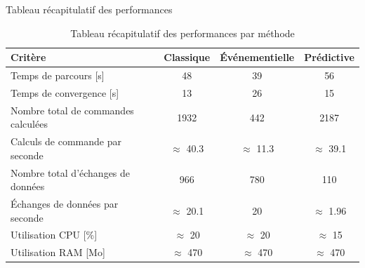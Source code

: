 \begin{frame}{Tableau récapitulatif des performances}
    
    \begin{table} %
    \centering
    \caption{Tableau récapitulatif des performances par méthode}
    \label{tab:recap-perf}
    \vspace{-0.5cm}
    \begin{tabular}{|l|c|c|c|}
        \hline
        Critère & Classique & Événementielle & Prédictive \\
        \hline
        Temps de parcours [s] & 48 & 39 & 56 \\
        Temps de convergence [s] & 13 & 26 & 15 \\
        \hline
        Nombre total de commandes calculées  & 1932 & 442 & 2187 \\
        Calculs de commande par seconde & $\approx$ 40.3 & $\approx$ 11.3 & $\approx$ 39.1 \\
        \hline
        Nombre total d'échanges de données  & 966 & 780 & 110 \\
        Échanges de données par seconde & $\approx$ 20.1 & 20 & $\approx$ 1.96 \\
        \hline
        Utilisation CPU [\%] & $\approx$ 20 & $\approx$ 20 & $\approx$ 15 \\
        Utilisation RAM [Mo] & $\approx$ 470 & $\approx$ 470 & $\approx$ 470 \\
        \hline
    \end{tabular}
    \end{table}
\end{frame}

